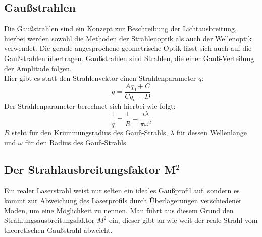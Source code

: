 \subsection{Gaußstrahlen}
Die Gaußstrahlen sind ein Konzept zur Beschreibung der Lichtausbreitung, hierbei werden  
sowohl die Methoden der Strahlenoptik als auch der Wellenoptik verwendet.
Die gerade angesprochene geometrische Optik lässt sich auch auf die Gaußstrahlen übertragen. 
Gaußstrahlen sind Strahlen, die einer Gauß-Verteilung der Amplitude folgen.\\ 
Hier gibt es statt den Strahlenvektor einen Strahlenparameter $q$:
\begin{equation}
    q = \frac{A q_0 + C}{C q_o + D}
\end{equation}
Der Strahlenparameter berechnet sich hierbei wie folgt:
\begin{equation}
    \frac{1}{q} = \frac{1}{R} - \frac{i \lambda }{\pi \omega^2}
\end{equation}
$R$ steht für den Krümmungsradius des Gauß-Strahls, $\lambda$ für dessen Wellenlänge und $\omega$ für den Radius des Gauß-Strahls. \citep[vgl.][]{optik}

\subsection{Der Strahlausbreitungsfaktor M$^2$}
Ein realer Laserstrahl weist nur selten ein ideales Gaußprofil auf, sondern es kommt zur Abweichung des Laserprofils durch Überlagerungen
verschiedener Moden, um eine Möglichkeit zu nennen. 
Man führt aus diesem Grund den Strahlungsausbreitungsfaktor $M^2$ ein, dieser gibt an wie weit der reale Strahl 
vom theoretischen Gaußstrahl abweicht.
